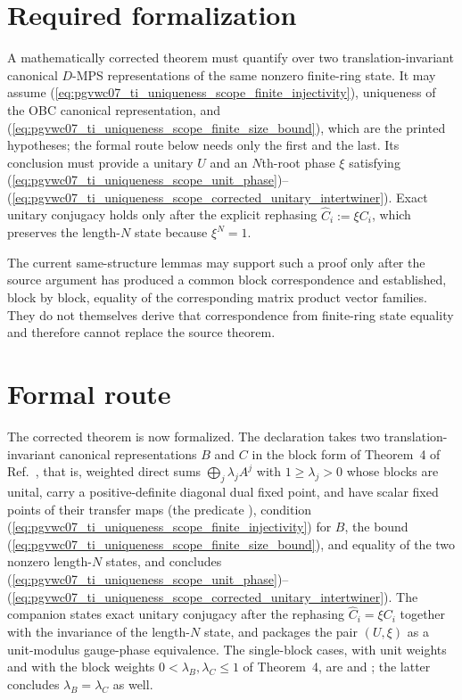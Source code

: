 \documentclass[11pt]{article}
\begin{document}
\section{Required formalization}

A mathematically corrected theorem must quantify over two
translation-invariant canonical $D$-MPS representations of the same nonzero
finite-ring state. It may assume
(\ref{eq:pgvwc07_ti_uniqueness_scope_finite_injectivity}), uniqueness of the
OBC canonical representation, and
(\ref{eq:pgvwc07_ti_uniqueness_scope_finite_size_bound}), which are the
printed hypotheses; the formal route below needs only the first and the last.
Its conclusion must provide a unitary $U$ and an $N$th-root phase $\xi$ satisfying
(\ref{eq:pgvwc07_ti_uniqueness_scope_unit_phase})--
(\ref{eq:pgvwc07_ti_uniqueness_scope_corrected_unitary_intertwiner}). Exact
unitary conjugacy holds only after the explicit rephasing
$\widehat C_i:=\xi C_i$, which preserves the length-$N$ state because
$\xi^N=1$.

The current same-structure lemmas may support such a proof only after the
source argument has produced a common block correspondence and established,
block by block, equality of the corresponding matrix product vector families.
They do not themselves derive that correspondence from finite-ring state
equality and therefore cannot replace the source theorem.

\section{Formal route}

The corrected theorem is now formalized. The declaration
 takes two
translation-invariant canonical representations $B$ and $C$ in the block
form of Theorem~4 of Ref.~\cite{PerezGarcia2007MPSReps}, that is, weighted
direct sums $\bigoplus_j\lambda_jA^j$ with $1\ge\lambda_j>0$ whose blocks are
unital, carry a positive-definite diagonal dual fixed point, and have scalar
fixed points of their transfer maps (the predicate
), condition
(\ref{eq:pgvwc07_ti_uniqueness_scope_finite_injectivity}) for $B$, the bound
(\ref{eq:pgvwc07_ti_uniqueness_scope_finite_size_bound}), and equality of the
two nonzero length-$N$ states, and concludes
(\ref{eq:pgvwc07_ti_uniqueness_scope_unit_phase})--%
(\ref{eq:pgvwc07_ti_uniqueness_scope_corrected_unitary_intertwiner}). The
companion 
states exact unitary conjugacy after the rephasing $\widehat C_i=\xi C_i$
together with the invariance of the length-$N$ state, and
packages the pair $(U,\xi)$ as a unit-modulus gauge-phase equivalence. The
single-block cases, with unit weights and with the block weights
$0<\lambda_B,\lambda_C\le1$ of Theorem~4, are
 and
; the latter concludes
$\lambda_B=\lambda_C$ as well.
\end{document}
